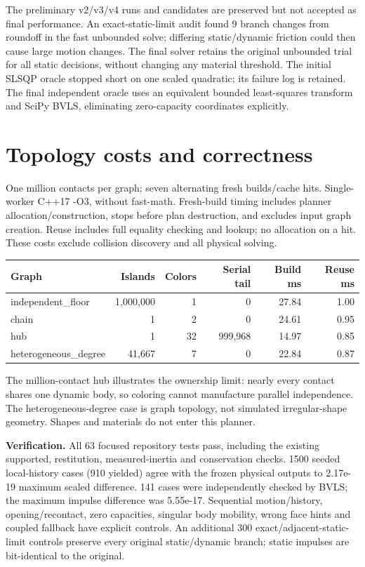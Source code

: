 \documentclass[10pt,a4paper]{article}
\newcommand{\toprule}{\hline}\newcommand{\midrule}{\hline}\newcommand{\bottomrule}{\hline}
\begin{document}
The preliminary v2/v3/v4 runs and candidates are preserved but not accepted
as final performance. An exact-static-limit audit found 9 branch changes from
roundoff in the fast unbounded solve; differing static/dynamic friction could
then cause large motion changes. The final solver retains the original unbounded
trial for all static decisions, without changing any material threshold. The initial SLSQP
oracle stopped short on one scaled quadratic; its failure log is retained. The
final independent oracle uses an equivalent bounded least-squares transform and
SciPy BVLS, eliminating zero-capacity coordinates explicitly.
\newpage
\section*{Topology costs and correctness}
One million contacts per graph; seven alternating fresh builds/cache hits.
Single-worker C++17 -O3, without fast-math. Fresh-build timing includes planner
allocation/construction, stops before plan destruction, and excludes input graph
creation. Reuse includes full equality checking and lookup; no allocation on a
hit. These costs exclude collision discovery and all physical solving.

\begin{center}\small
\begin{tabular}{lrrrrr}\toprule
Graph & Islands & Colors & Serial tail & Build ms & Reuse ms\\\midrule
independent\_floor & 1,000,000 & 1 & 0 & 27.84 & 1.00 \\
chain & 1 & 2 & 0 & 24.61 & 0.95 \\
hub & 1 & 32 & 999,968 & 14.97 & 0.85 \\
heterogeneous\_degree & 41,667 & 7 & 0 & 22.84 & 0.87 \\
\bottomrule\end{tabular}\end{center}
The million-contact hub illustrates the ownership limit: nearly every contact
shares one dynamic body, so coloring cannot manufacture parallel independence.
The heterogeneous-degree case is graph topology, not simulated irregular-shape
geometry. Shapes and materials do not enter this planner.

\textbf{Verification.} All 63 focused repository tests pass, including the
existing supported, restitution, measured-inertia and conservation checks.
1500 seeded local-history cases (910 yielded) agree
with the frozen physical outputs to 2.17e-19 maximum scaled difference.
141 cases were independently checked by BVLS;
the maximum impulse difference was 5.55e-17.
Sequential motion/history, opening/recontact, zero capacities, singular body
mobility, wrong face hints and coupled fallback have explicit controls.
An additional 300 exact/adjacent-static-limit controls preserve every original
static/dynamic branch; static impulses are bit-identical to the original.
\end{document}
